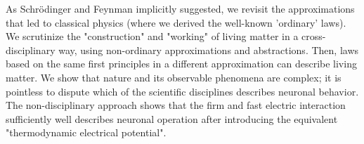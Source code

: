 As Schr\"odinger and Feynman implicitly suggested, we revisit the approximations that led to classical physics (where we derived the well-known 'ordinary' laws).
We scrutinize the "construction" and "working" of living matter in a cross-disciplinary way, using non-ordinary approximations and abstractions.
Then, laws based on the same first principles in a different approximation can describe living matter.
We show that nature and its observable phenomena are complex; it is pointless to dispute
which of the scientific disciplines describes neuronal behavior. The non-disciplinary approach shows that the firm and fast electric interaction sufficiently well describes neuronal operation after introducing the equivalent "thermodynamic electrical potential".




